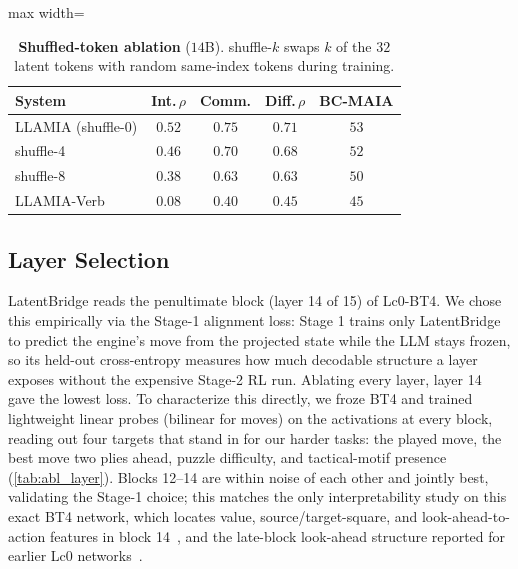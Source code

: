 \begin{table}[h]
\centering
\caption{\textbf{Shuffled-token ablation} ($14$B). shuffle-$k$ swaps $k$ of the $32$ latent tokens with random same-index tokens during training.}
\label{tab:abl_shuffle}
\begin{adjustbox}{max width=\columnwidth}
\renewcommand{\arraystretch}{1.2}
\small
\begin{tabular}{lcccc}
\toprule[1.2pt]
\textbf{System} & \textbf{Int.\,$\rho$} & \textbf{Comm.} & \textbf{Diff.\,$\rho$} & \textbf{BC-MAIA} \\
\midrule
LLAMIA (shuffle-0) & $0.52$ & $0.75$ & $0.71$ & $53$ \\
shuffle-4          & $0.46$ & $0.70$ & $0.68$ & $52$ \\
shuffle-8          & $0.38$ & $0.63$ & $0.63$ & $50$ \\
LLAMIA-Verb        & $0.08$ & $0.40$ & $0.45$ & $45$ \\
\bottomrule[1.2pt]
\end{tabular}
\end{adjustbox}
\end{table}

\subsection{Layer Selection}
\label{sec:abl_layer}

LatentBridge reads the penultimate block (layer 14 of 15) of Lc0-BT4. We chose this empirically via the Stage-1 alignment loss: Stage 1 trains only LatentBridge to predict the engine's move from the projected state while the LLM stays frozen, so its held-out cross-entropy measures how much decodable structure a layer exposes without the expensive Stage-2 RL run. Ablating every layer, layer 14 gave the lowest loss. To characterize this directly, we froze BT4 and trained lightweight linear probes (bilinear for moves) on the activations at every block, reading out four targets that stand in for our harder tasks: the played move, the best move two plies ahead, puzzle difficulty, and tactical-motif presence (\cref{tab:abl_layer}). Blocks 12--14 are within noise of each other and jointly best, validating the Stage-1 choice; this matches the only interpretability study on this exact BT4 network, which locates value, source/target-square, and look-ahead-to-action features in block 14~\cite{lin2026bt4features}, and the late-block look-ahead structure reported for earlier Lc0 networks~\cite{jenner2024evidence}.

